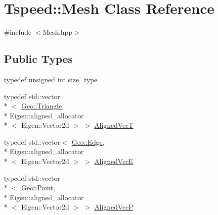\hypertarget{classTspeed_1_1Mesh}{\section{Tspeed\-:\-:Mesh Class Reference}
\label{classTspeed_1_1Mesh}
}


{\ttfamily \#include $<$Mesh.\-hpp$>$}

\subsection*{Public Types}
\begin{DoxyCompactItemize}
\item 
typedef unsigned int \hyperlink{classTspeed_1_1Mesh_a097181c50faa6c8cec5dbe135694606b}{size\-\_\-type}
\item 
typedef std\-::vector\\*
$<$ \hyperlink{classTspeed_1_1Geo_1_1Triangle}{Geo\-::\-Triangle}, \\*
Eigen\-::aligned\-\_\-allocator\\*
$<$ Eigen\-::\-Vector2d $>$ $>$ \hyperlink{classTspeed_1_1Mesh_ae62a59eea301689dd9f7c9663414db18}{Aligned\-Vec\-T}
\item 
typedef std\-::vector$<$ \hyperlink{classTspeed_1_1Geo_1_1Edge}{Geo\-::\-Edge}, \\*
Eigen\-::aligned\-\_\-allocator\\*
$<$ Eigen\-::\-Vector2d $>$ $>$ \hyperlink{classTspeed_1_1Mesh_a09031b0dab0f2efcef61981dfc9d1640}{Aligned\-Vec\-E}
\item 
typedef std\-::vector\\*
$<$ \hyperlink{classTspeed_1_1Geo_1_1Point}{Geo\-::\-Point}, \\*
Eigen\-::aligned\-\_\-allocator\\*
$<$ Eigen\-::\-Vector2d $>$ $>$ \hyperlink{classTspeed_1_1Mesh_aa8aac31131166087d192ef77c49fb5b2}{Aligned\-Vec\-P}
\end{DoxyCompactItemize}
